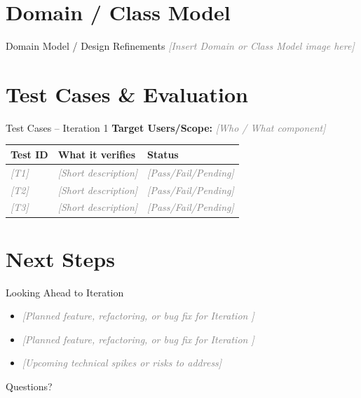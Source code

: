 \documentclass[11pt,aspectratio=169]{beamer}
\newcommand{\iterationNumber}{1} %
\newcounter{nextIter}
\newcommand{\nextIteration}{\thenextIter}
\newcommand{\fillin}[1]{\textcolor{gray}{\itshape [#1]}}
\begin{document}
\section{Domain / Class Model}

\begin{frame}{Domain Model / Design Refinements}
\centering
\fillin{Insert Domain or Class Model image here}
\end{frame}

\section{Test Cases \& Evaluation}

\begin{frame}{Test Cases -- Iteration \iterationNumber}
\textbf{Target Users/Scope:} \fillin{Who / What component}
\vspace{0.5em}

\begin{tabular}{@{}p{2.2cm}p{4.5cm}p{2.5cm}@{}}
\toprule
\textbf{Test ID} & \textbf{What it verifies} & \textbf{Status} \\
\midrule
\fillin{T1} & \fillin{Short description} & \fillin{Pass/Fail/Pending} \\
\fillin{T2} & \fillin{Short description} & \fillin{Pass/Fail/Pending} \\
\fillin{T3} & \fillin{Short description} & \fillin{Pass/Fail/Pending} \\
\bottomrule
\end{tabular}
\end{frame}

\section{Next Steps}

\begin{frame}{Looking Ahead to Iteration \nextIteration}
\begin{itemize}
  \item \fillin{Planned feature, refactoring, or bug fix for Iteration \nextIteration}
  \item \fillin{Planned feature, refactoring, or bug fix for Iteration \nextIteration}
  \item \fillin{Upcoming technical spikes or risks to address}
\end{itemize}
\end{frame}

\begin{frame}[standout]
Questions?
\end{frame}
\end{document}
